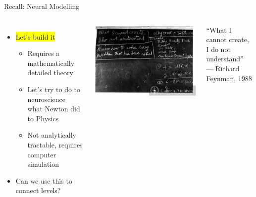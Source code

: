 \documentclass[handout,aspectratio=169]{beamer}
\begin{document}
\begin{frame}{Recall: Neural Modelling}
	\begin{overlayarea}{\textwidth}{7cm}
		\begin{columns}[c]
			\begin{itemize}
				\setlength\itemsep{0.25cm}
				\item \hl{Let's build it}\\[0.125cm]
				\begin{itemize}
					\setlength\itemsep{0.25cm}
					\item Requires a mathematically detailed theory
					\item Let's try to do to neuroscience what Newton did to Physics
					\item Not analytically tractable, requires computer simulation
				\end{itemize}
				\item Can we use this to connect levels?
			\end{itemize}
			\centering
			\includegraphics[width=\columnwidth]{media/feynman_blackboard.jpg}
			\begin{center}
				\color{aluminium4}
				\quotefont \enquote{What I cannot create, I do not understand} \\ --- Richard Feynman, 1988
			\end{center}
		\end{columns}
	\end{overlayarea}
\end{frame}
\end{document}
